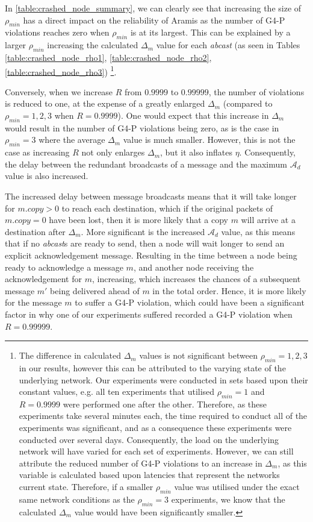    In \ref{table:crashed_node_summary}, we can clearly see that increasing the size of $\rho_{min}$ has a direct impact on the reliability of \textsf{Aramis} as the number of G4-P violations reaches zero when $\rho_{min}$ is at its largest.  This can be explained by a larger $\rho_{min}$ increasing the calculated $\Delta_m$ value for each \emph{abcast} (as seen in Tables \ref{table:crashed_node_rho1}, \ref{table:crashed_node_rho2},  \ref{table:crashed_node_rho3}) \footnote{The difference in calculated $\Delta_m$ values is not significant between $\rho_{min}=1,2,3$ in our results, however this can be attributed to the varying state of the underlying network.  Our experiments were conducted in sets based upon their constant values, e.g. all ten experiments that utilised $\rho_{min}=1$ and $R=0.9999$ were performed one after the other.  Therefore, as these experiments take several minutes each, the time required to conduct all of the experiments was significant, and as a consequence these experiments were conducted over several days.  Consequently, the load on the underlying network will have varied for each set of experiments.  However, we can still attribute the reduced number of G4-P violations to an increase in $\Delta_m$, as this variable is calculated based upon latencies that represent the networks current state.  Therefore, if a smaller $\rho_{min}$ value was utilised under the exact same network conditions as the $\rho_{min}=3$ experiments, we know that the calculated $\Delta_m$ value would have been significantly smaller.}.  
    
    Conversely, when we increase $R$ from $0.9999$ to $0.99999$, the number of violations is reduced to one, at the expense of a greatly enlarged $\Delta_m$ (compared to $\rho_{min}=1,2,3$ when $R=0.9999$).  One would expect that this increase in $\Delta_m$ would result in the number of G4-P violations being zero, as is the case in $\rho_{min}=3$ where the average $\Delta_m$ value is much smaller.  However, this is not the case as increasing $R$ not only enlarges $\Delta_m$, but it also inflates $\eta$.  Consequently, the delay between the redundant broadcasts of a message and the maximum $\mathcal{A}_d$ value is also increased. 
    
     The increased delay between message broadcasts means that it will take longer for $m.copy > 0$ to reach each destination, which if the original packets of $m.copy = 0$ have been lost, then it is more likely that a copy $m$ will arrive at a destination after $\Delta_m$.  More significant is the increased  $\mathcal{A}_d$ value, as this means that if no \emph{abcast}s are ready to send, then a node will wait longer to send an explicit acknowledgement message.  Resulting in the time between a node being ready to acknowledge a message $m$, and another node receiving the acknowledgement for $m$, increasing, which increases the chances of a subsequent message $m'$ being delivered ahead of $m$ in the total order. Hence, it is more likely for the message $m$ to suffer a G4-P violation, which could have been a significant factor in why one of our experiments suffered recorded a G4-P violation when $R=0.99999$.  
    
